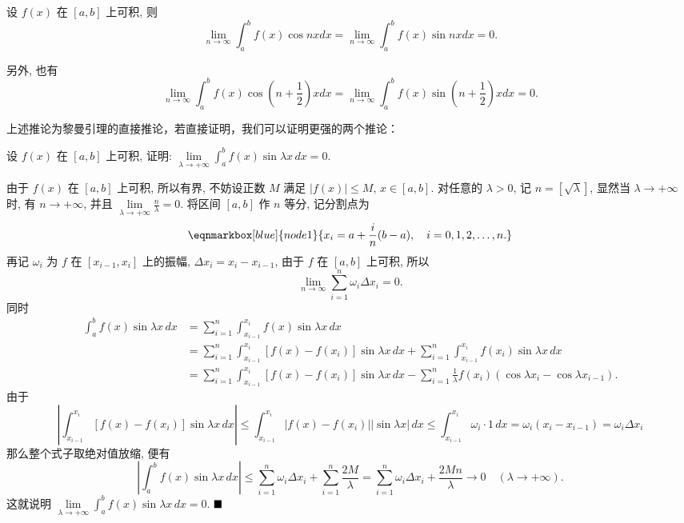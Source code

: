\documentclass[lang=cn,newtx,10pt,scheme=chinese]{elegantbook}
\begin{document}
\begin{corollary}
设 $f(x)$ 在 $[a, b]$ 上可积, 则
$$\lim_{n \to \infty} \int_a^b f(x) \cos nx dx = \lim_{n \to \infty} \int_a^b f(x) \sin nx dx = 0.$$

另外, 也有
$$\lim_{n \to \infty} \int_a^b f(x) \cos \left(n + \frac{1}{2}\right) x dx = \lim_{n \to \infty} \int_a^b f(x) \sin \left(n + \frac{1}{2}\right) x dx = 0.$$
\end{corollary}

上述推论为黎曼引理的直接推论，若直接证明，我们可以证明更强的两个推论：

\begin{lemma}
设 $f(x)$ 在 $[a, b]$ 上可积, 证明: $\lim\limits_{\lambda \to +\infty} \int_{a}^{b} f(x) \sin \lambda x \,dx = 0$.
\end{lemma}
\begin{solution}
由于 $f(x)$ 在 $[a, b]$ 上可积, 所以有界, 不妨设正数 $M$ 满足 $|f(x)| \leq M$, $x \in [a, b]$. 对任意的 $\lambda > 0$, 记 $n = [\sqrt{\lambda}]$, 显然当 $\lambda \to +\infty$ 时, 有 $n \to +\infty$, 并且 $\lim\limits_{\lambda \to +\infty} \frac{n}{\lambda} = 0$. 将区间 $[a, b]$ 作 $n$ 等分, 记分割点为
\begin{equation*}
\eqnmarkbox[blue]{node1}{x_i = a + \frac{i}{n}(b-a), \quad i = 0, 1, 2, \dots, n.}
\end{equation*}
再记 $\omega_i$ 为 $f$ 在 $[x_{i-1}, x_i]$ 上的振幅, $\Delta x_i = x_i - x_{i-1}$, 由于 $f$ 在 $[a, b]$ 上可积, 所以
$$\lim\limits_{n \to \infty} \sum_{i=1}^{n} \omega_i \Delta x_i = 0.$$
同时
\begin{align*} \int_{a}^{b} f(x) \sin \lambda x \,dx &= \sum_{i=1}^{n} \int_{x_{i-1}}^{x_i} f(x) \sin \lambda x \,dx \\ &= \sum_{i=1}^{n} \int_{x_{i-1}}^{x_i} [f(x) - f(x_i)] \sin \lambda x \,dx + \sum_{i=1}^{n} \int_{x_{i-1}}^{x_i} f(x_i) \sin \lambda x \,dx \\ &= \sum_{i=1}^{n} \int_{x_{i-1}}^{x_i} [f(x) - f(x_i)] \sin \lambda x \,dx - \sum_{i=1}^{n} \frac{1}{\lambda} f(x_i) (\cos \lambda x_i - \cos \lambda x_{i-1}). \end{align*}
由于
$$\left| \int_{x_{i-1}}^{x_i} [f(x) - f(x_i)] \sin \lambda x \,dx \right| \leq \int_{x_{i-1}}^{x_i} |f(x) - f(x_i)| |\sin \lambda x| \,dx \leq \int_{x_{i-1}}^{x_i} \omega_i \cdot 1 \,dx = \omega_i (x_i - x_{i-1}) = \omega_i \Delta x_i$$
那么整个式子取绝对值放缩, 便有
$$\left| \int_{a}^{b} f(x) \sin \lambda x \,dx \right| \leq \sum_{i=1}^{n} \omega_i \Delta x_i + \sum_{i=1}^{n} \frac{2M}{\lambda} = \sum_{i=1}^{n} \omega_i \Delta x_i + \frac{2Mn}{\lambda} \to 0 \quad (\lambda \to +\infty).$$
这就说明 $\lim\limits_{\lambda \to +\infty} \int_{a}^{b} f(x) \sin \lambda x \,dx = 0$.
$\hfill \blacksquare$
\end{solution}
\end{document}
